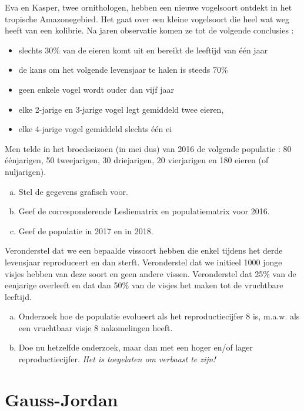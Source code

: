 \documentclass[12pt,twoside]{article}
\begin{document}
\begin{oefening}
Eva en Kasper, twee ornithologen, hebben een nieuwe vogelsoort ontdekt in het tropische Amazonegebied.  Het gaat over een kleine vogelsoort die heel wat weg heeft van een kolibrie.  Na jaren observatie komen ze tot de volgende conclusies :
\begin{itemize}
  \item slechts 30\% van de eieren komt uit en bereikt de leeftijd van één jaar
  \item de kans om het volgende levensjaar te halen is steeds 70\%
  \item geen enkele vogel wordt ouder dan vijf jaar
  \item elke 2-jarige en 3-jarige vogel legt gemiddeld twee eieren,
  \item elke 4-jarige vogel gemiddeld slechts één ei
\end{itemize}
Men telde in het broedseizoen (in mei dus) van 2016 de volgende populatie :
80 éénjarigen, 50 tweejarigen, 30 driejarigen, 20 vierjarigen en 180 eieren (of nuljarigen).

\begin{enumerate}[(a)]
  \item Stel de gegevens grafisch voor.
  \item Geef de corresponderende Lesliematrix en populatiematrix voor 2016.
  \item Geef de populatie in 2017 en in 2018.
\end{enumerate}
\end{oefening}

\begin{oefening}
Veronderstel dat we een bepaalde vissoort hebben die enkel tijdens het derde levensjaar reproduceert en dan sterft. Veronderstel dat we initieel 1000 jonge visjes hebben van deze soort en geen andere vissen. Veronderstel dat 25\% van de eenjarige overleeft en dat dan 50\% van de visjes het maken tot de vruchtbare leeftijd.
\begin{enumerate}[(a)]
  \item Onderzoek hoe de populatie evolueert als het reproductiecijfer 8 is, m.a.w. als een vruchtbaar visje 8 nakomelingen heeft.
  \item Doe nu hetzelfde onderzoek, maar dan met een hoger en/of lager reproductiecijfer. {\em Het is toegelaten om verbaast te zijn!}
\end{enumerate}
\end{oefening}

\pagebreak
\section{Gauss-Jordan}
\end{document}
